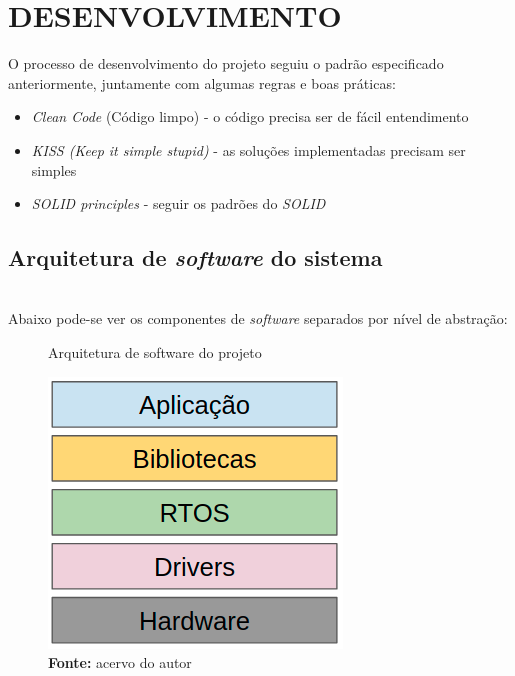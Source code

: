 \documentclass[times, twoside, watermark]{artigo}
\begin{document}

\section{DESENVOLVIMENTO}

O processo de desenvolvimento do projeto seguiu o padrão especificado anteriormente,
juntamente com algumas regras e boas práticas:

\begin{itemize}
\item \textit{Clean Code} (Código limpo) - o código precisa ser de fácil 
entendimento\cite{martin2009clean}
\item \textit{KISS (Keep it simple stupid)} - as soluções implementadas precisam ser 
simples\cite{martin2018clean}
\item \textit{SOLID principles} - seguir os padrões do \textit{SOLID}
\cite{martin2002agile}
\end{itemize}

\subsection{Arquitetura de \textit{software} do sistema}\hfill\\
Abaixo pode-se ver os componentes de \textit{software} separados por nível de abstração:\hfill\\

\begin{figure}[H]
    \centering
    \caption{Arquitetura de software do projeto}
    \includegraphics[width=0.7\linewidth]{images/arch.png}
    \caption*{\newline\textbf{Fonte:} acervo do autor}
\end{figure}
\end{document}
